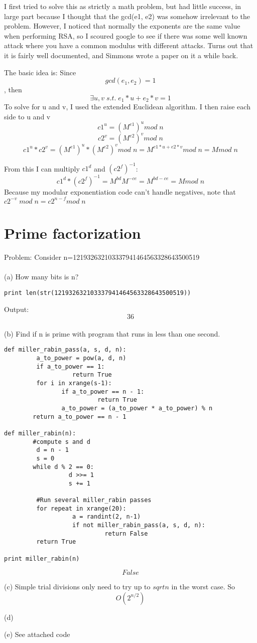 \documentclass[12pt]{article}
\begin{document}
I first tried to solve this as strictly a math problem, but had little success, in large part because I thought that
the gcd(e1, e2) was somehow irrelevant to the problem. However, I noticed that normally the exponents are the same value
when performing RSA, so I scoured google to see if there was some well known attack where you have a common modulus with
different attacks. Turns out that it is fairly well documented, and Simmons wrote a paper on it a while back.

The basic idea is:
Since \[gcd(e_1,e_2) = 1\],
then \[\exists u, v   \;  s.t.   \;  e_1*u + e_2*v = 1\]
To solve for u and v, I used the extended Euclidean algorithm.
I then raise each side to u and v
\[c1^u = (M^{e1})^{u} mod \; n\]
\[c2^v = (M^{e2})^{v} mod \; n\]
\[c1^u * c2^v =  (M^{e1})^{u}*(M^{e2})^{v} mod \; n =  M^{e1*u + e2*v} mod \; n = M mod \; n\]

From this I can multiply $c1^d$ and $(c2^f)^{-1}$: \[c1^d * (c2^f)^{-1} = M^{bd}M^{-ce} = M^{bd-ce}=M mod  \; n\]
Because my modular exponentiation code can't handle negatives, note that $c2^{-v} \; mod \; n = c2^{n-f} mod \; n$


\section{Prime factorization}

Problem: Consider n=121932632103337941464563328643500519
\\\\(a) How many bits is n?
\begin{verbatim}
print len(str(121932632103337941464563328643500519))
\end{verbatim}
Output:  \[\boxed{36}\] 
\\(b) Find if n is prime with program that runs in less than one second.
\begin{verbatim}
def miller_rabin_pass(a, s, d, n):
         a_to_power = pow(a, d, n)
         if a_to_power == 1:
                   return True
         for i in xrange(s-1):
                if a_to_power == n - 1:
                          return True
                a_to_power = (a_to_power * a_to_power) % n
        return a_to_power == n - 1

def miller_rabin(n):
        #compute s and d
         d = n - 1
         s = 0
        while d % 2 == 0:
                  d >>= 1
                  s += 1

         #Run several miller_rabin passes
         for repeat in xrange(20):
                   a = randint(2, n-1)
                   if not miller_rabin_pass(a, s, d, n):
                            return False
         return True

print miller_rabin(n)

\end{verbatim}

\[
\boxed{False}
\]

(c) Simple trial divisions only need to try up to  $sqrt{n}$ in the worst case. So \[
\boxed{O(2^{n/2})}
\]

(d) 

(e) See attached code
\end{document}

